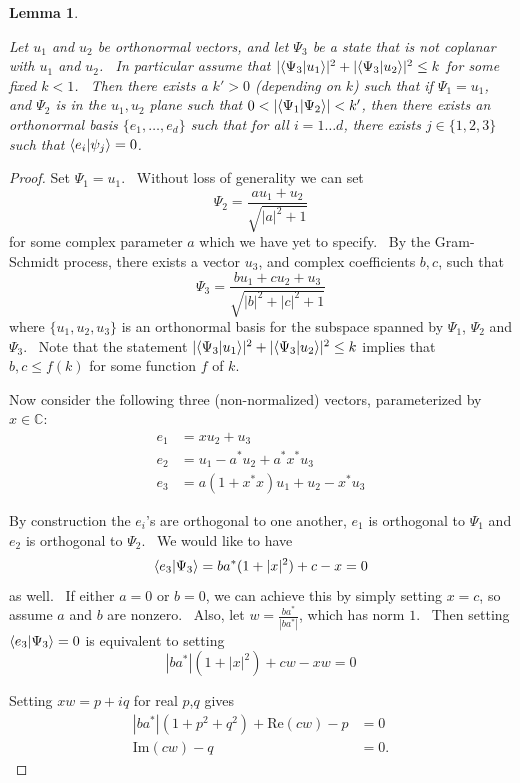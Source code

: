 \documentclass[letterpaper,11pt]{article}
\newtheorem{lem}{Lemma}
\newcommand{\braket}[2]{\mbox{$ \langle #1 | #2 \rangle $}}
\begin{document}
\begin{lem}
\label{lem:ortho-basis-psii}

Let $u_1$ and $u_2$ be orthonormal vectors, and let $\Psi_3$ be a state that is not coplanar with $u_1$ and $u_2$. \ In particular assume that $|\braket{\Psi_3}{u_1}|^2+|\braket{\Psi_3}{u_2}|^2\leq k$ for some fixed $k<1$. \ Then there exists a $k'>0$  (depending on $k$) such that if $\Psi_1=u_1$, and $\Psi_2$ is in the $u_1,u_2$ plane such that $0<|\braket{\Psi_1}{\Psi_2}|<k'$, then there exists an orthonormal basis $\{e_1, \ldots, e_d\}$ such that for all $i=1\ldots d$, there exists $j \in \{1,2,3\}$ such that $\braket{e_i}{\psi_j}=0$.

\end{lem}
\begin{proof}

Set $\Psi_1=u_1$. \ Without loss of generality we can set
\[
\Psi_2 = \frac{a u_1 + u_2}{\sqrt{|a|^2 + 1}}
\] for some complex parameter $a$ which we have yet to specify. \ By the Gram-Schmidt process, there exists a vector $u_3$, and complex coefficients $b,c$, such that
\[
\Psi_3 = \frac{b u_1 + c u_2 + u_3}{\sqrt{|b|^2 + |c|^2 + 1}}
\]
\noindent where $\{u_1, u_2, u_3\}$ is an orthonormal basis for the subspace spanned by $\Psi_1$, $\Psi_2$ and $\Psi_3$. \ Note that the statement $|\braket{\Psi_3}{u_1}|^2+|\braket{\Psi_3}{u_2}|^2\leq k$ implies that $b, c \leq f(k)$ for some function $f$ of $k$.


Now consider the following three (non-normalized) vectors, parameterized by $x\in \mathbb{C}$:
\begin{align*}
e_1 &=      x u_2 +           u_3 \\
e_2 &= u_1 -  a^* u_2 + a^* x^* u_3 \\
e_3 &= a (1 + x^* x) u_1 +      u_2 -       x^* u_3
\end{align*}

By construction the $e_i$'s are orthogonal to one another, $e_1$ is orthogonal to $\Psi_1$ and $e_2$ is orthogonal to $\Psi_2$. \ We would like to have
\[\braket{e_3}{\Psi_3}=ba^* (1 + |x|^2) + c - x = 0\]
as well. \ If either $a=0$ or $b=0$, we can achieve this by simply setting $x = c$, so assume $a$ and $b$ are nonzero. \ Also, let $w = \frac{ba^*}{|ba^*|}$, which has norm $1$. \ Then setting $\braket{e_3}{\Psi_3}=0$ is equivalent to setting
\[
|ba^*| (1 + |x|^2) + cw - xw = 0
\]

\noindent Setting $xw = p + iq$ for real $p$,$q$ gives
\begin{align*}
|ba^*| (1 + p^2 + q^2) + \mathrm{Re}(cw) - p &= 0\\
\mathrm{Im}(cw) - q &= 0.
\end{align*}


\end{proof}
\end{document}
